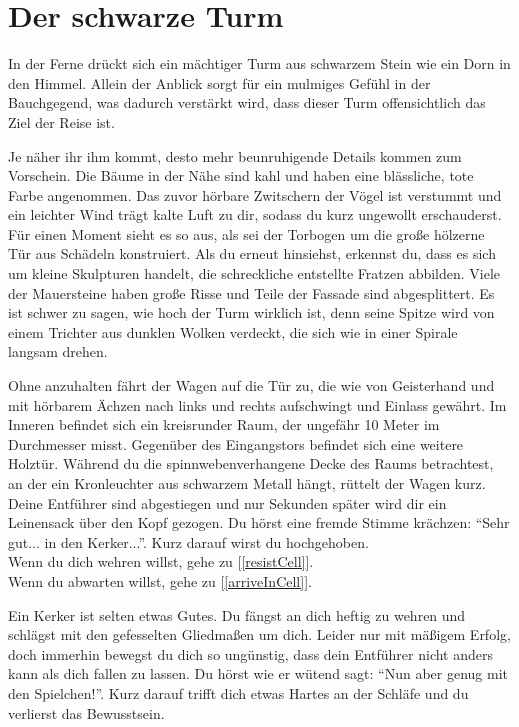 \chapter{Der schwarze Turm}


In der Ferne drückt sich ein mächtiger Turm aus schwarzem Stein wie ein Dorn in den Himmel. Allein der Anblick sorgt für ein mulmiges Gefühl in der Bauchgegend, was dadurch verstärkt wird, dass dieser Turm offensichtlich das Ziel der Reise ist.

Je näher ihr ihm kommt, desto mehr beunruhigende Details kommen zum Vorschein. Die Bäume in der Nähe sind kahl und haben eine blässliche, tote Farbe angenommen. Das zuvor hörbare Zwitschern der Vögel ist verstummt und ein leichter Wind trägt kalte Luft zu dir, sodass du kurz ungewollt erschauderst. Für einen Moment sieht es so aus, als sei der Torbogen um die große hölzerne Tür aus Schädeln konstruiert. Als du erneut hinsiehst, erkennst du, dass es sich um kleine Skulpturen handelt, die schreckliche entstellte Fratzen abbilden. Viele der Mauersteine haben große Risse und Teile der Fassade sind abgesplittert.
Es ist schwer zu sagen, wie hoch der Turm wirklich ist, denn seine Spitze wird von einem Trichter aus dunklen Wolken verdeckt, die sich wie in einer Spirale langsam drehen.

Ohne anzuhalten fährt der Wagen auf die Tür zu, die wie von Geisterhand und mit hörbarem Ächzen nach links und rechts aufschwingt und Einlass gewährt. Im Inneren befindet sich ein kreisrunder Raum, der ungefähr 10 Meter im Durchmesser misst. Gegenüber des Eingangstors befindet sich eine weitere Holztür. Während du die spinnwebenverhangene Decke des Raums betrachtest, an der ein Kronleuchter aus schwarzem Metall hängt, rüttelt der Wagen kurz. Deine Entführer sind abgestiegen und nur Sekunden später wird dir ein Leinensack über den Kopf gezogen. Du hörst eine fremde Stimme krächzen: ``Sehr gut... in den Kerker...''. Kurz darauf wirst du hochgehoben.
\\Wenn du dich wehren willst, gehe zu [\ref{resistCell}].
\\Wenn du abwarten willst, gehe zu [\ref{arriveInCell}].


Ein Kerker ist selten etwas Gutes. Du fängst an dich heftig zu wehren und schlägst mit den gefesselten Gliedmaßen um dich. Leider nur mit mäßigem Erfolg, doch immerhin bewegst du dich so ungünstig, dass dein Entführer nicht anders kann als dich fallen zu lassen. Du hörst wie er wütend sagt: ``Nun aber genug mit den Spielchen!''. Kurz darauf trifft dich etwas Hartes an der Schläfe und du verlierst das Bewusstsein.

